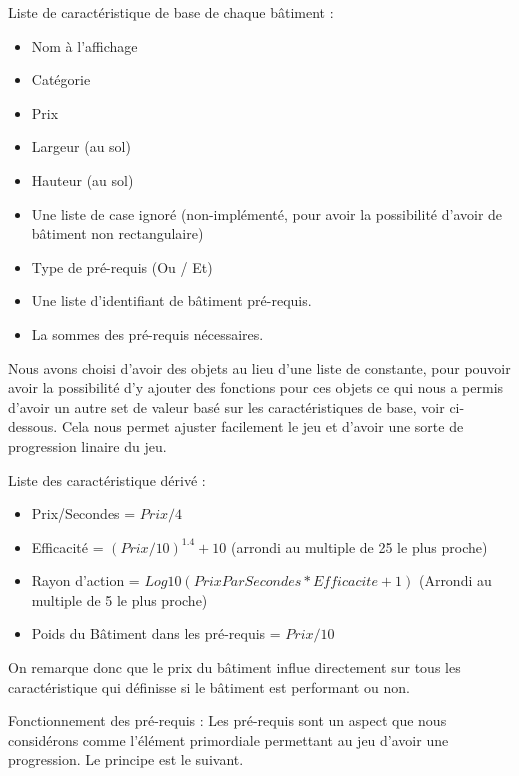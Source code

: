 \documentclass[a4paper,10pt,openany,oneside]{book}
\begin{document}
Liste de caractéristique de base de chaque bâtiment :
\begin{itemize}
	\item Nom à l'affichage
	\item Catégorie
	\item Prix
	\item Largeur (au sol)
	\item Hauteur (au sol)
	\item Une liste de case ignoré (non-implémenté, pour avoir la possibilité d'avoir de bâtiment non rectangulaire)
	\item Type de pré-requis (Ou / Et)
	\item Une liste d'identifiant de bâtiment pré-requis.
	\item La sommes des pré-requis nécessaires. 
\end{itemize}

Nous avons choisi d'avoir des objets au lieu d'une liste de constante, pour pouvoir avoir la possibilité d'y ajouter des fonctions pour ces objets ce qui nous a permis d'avoir un autre set de valeur basé sur les caractéristiques de base, voir ci-dessous. Cela nous permet ajuster facilement le jeu et d'avoir une sorte de progression linaire du jeu.

Liste des caractéristique dérivé :
\begin{itemize}
  \item Prix/Secondes = \(Prix / 4\)
  \item Efficacité = \((Prix/10)^{1.4} + 10\) (arrondi au multiple de 25 le plus proche)
  \item Rayon d'action = \(Log10(PrixParSecondes*Efficacite + 1)\) (Arrondi au multiple de 5 le plus proche)
  \item Poids du Bâtiment dans les pré-requis = \(Prix / 10\)
\end{itemize}

On remarque donc que le prix du bâtiment influe directement sur tous les caractéristique qui définisse si le bâtiment est performant ou non.

Fonctionnement des pré-requis :
Les pré-requis sont un aspect que nous considérons comme l'élément primordiale permettant au jeu d'avoir une progression. Le principe est le suivant.
\end{document}

